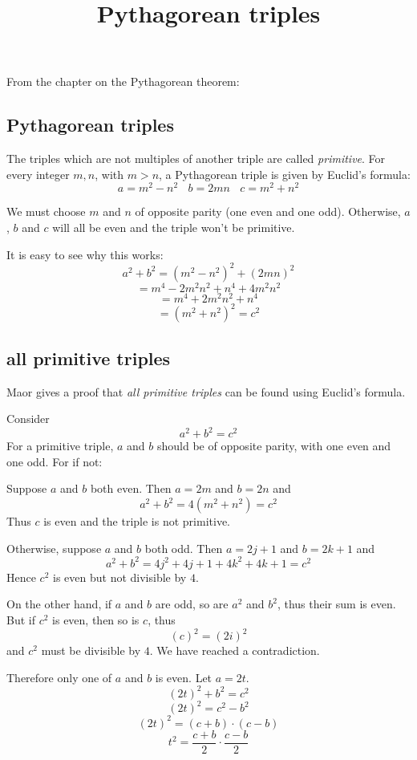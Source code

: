 \documentclass[11pt, oneside]{article}
\title{Pythagorean triples}
\date{}
\begin{document}
\maketitle
\Large

\label{sec:pythagorean_triples}
 
From the chapter on the Pythagorean theorem:
\subsection*{Pythagorean triples}
The triples which are not multiples of another triple are called \emph{primitive}.  For every integer $m,n$, with $m > n$, a Pythagorean triple is given by Euclid's formula:
\[ a = m^2 - n^2 \ \ \ \ b = 2mn \ \ \ \ c = m^2 + n^2 \]

We must choose $m$ and $n$ of opposite parity (one even and one odd).  Otherwise, $a$, $b$ and $c$ will all be even and the triple won't  be primitive.

It is easy to see why this works:
\[ a^2 + b^2 = (m^2 - n^2)^2 + (2mn)^2 \]
\[ = m^4 - 2m^2n^2 + n^4 + 4m^2n^2 \]
\[ = m^4 + 2m^2n^2 + n^4 \]
\[ = (m^2 + n^2)^2 = c^2 \]

\subsection*{all primitive triples}
Maor gives a proof that \emph{all primitive triples} can be found using Euclid's formula.

Consider 
\[ a^2 + b^2 = c^2 \]
For a primitive triple, $a$ and $b$ should be of opposite parity, with one even and one odd.  For if not:

Suppose $a$ and $b$ both even.  Then $a = 2m$ and $b = 2n$ and
\[ a^2 + b^2 = 4(m^2 + n^2) = c^2 \]
Thus $c$ is even and the triple is not primitive.

Otherwise, suppose $a$ and $b$ both odd.  Then $a = 2j +1$ and $b = 2k + 1$ and
\[ a^2 + b^2 = 4j^2 + 4j + 1 + 4k^2 + 4k + 1 = c^2 \]
Hence $c^2$ is even but not divisible by $4$.

On the other hand, if $a$ and $b$ are odd, so are $a^2$ and $b^2$, thus their sum is even.  But if $c^2$ is even, then so is $c$, thus 
\[ (c)^2 = (2i)^2 \]
and $c^2$ must be divisible by $4$.  We have reached a contradiction.  

Therefore only one of $a$ and $b$ is even.  Let $a = 2t$.
\[ (2t)^2 + b^2 = c^2 \]
\[ (2t)^2 = c^2 - b^2 \]
\[ (2t)^2 = (c + b) \cdot (c - b) \]
\[ t^2 = \frac{c+b}{2} \cdot \frac{c - b}{2} \]
\end{document}
